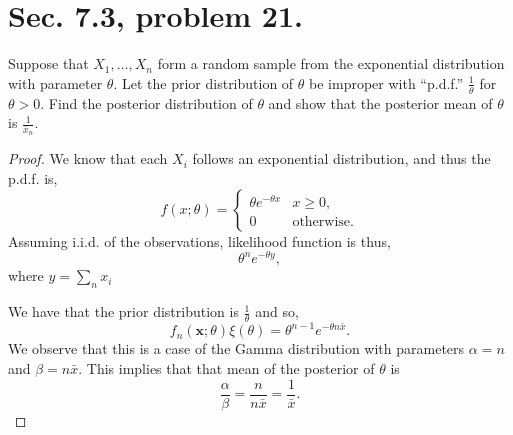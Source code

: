 \documentclass{article}
\newcommand{\randsamp}{X_1,\dots,X_n}
\newcommand{\pdf}{p.d.f. }
\newenvironment{hwproof}[1]
{
    #1
    \begin{proof}
}{
    \end{proof}
}
\begin{document}
\section{Sec. 7.3, problem 21.}
\begin{hwproof}
    {
        Suppose that $\randsamp$ form a random sample from the exponential
        distribution with parameter $\theta$. Let the prior distribution of $\theta$
        be improper with “p.d.f.” $\frac{1}{\theta}$ for $\theta > 0$. Find
        the posterior distribution of $\theta$ and show that the posterior mean
        of $\theta$ is $\frac{1}{\bar{x}_n}$.
    }

    We know that each $X_i$ follows an exponential distribution, and thus the \pdf
    is,
    \begin{equation*}
        f(x ;\theta) = \begin{cases}
            \theta e^{-\theta x} & x \geq 0,         \\
            0                    & \text{otherwise}.
        \end{cases}
    \end{equation*}
    Assuming i.i.d. of the observations, likelihood function is thus,
    \begin{equation*}
        \theta^n e^{-\theta y},
    \end{equation*}
    where $y = \sum_n x_i$

    We have that the prior distribution is $\frac{1}{\theta}$ and so,
    \begin{equation*}
        f_n(\bm{x};\theta)\xi(\theta) = \theta^{n-1}e^{-\theta n\bar{x}}.
    \end{equation*}
    We observe that this is a case of the Gamma distribution with parameters
    $\alpha = n$ and $\beta = n \bar{x}$. This implies that that mean of the
    posterior of $\theta$ is
    \begin{equation*}
        \frac{\alpha}{\beta} = \frac{n}{n\bar{x}} = \frac{1}{\bar{x}}.
    \end{equation*}
\end{hwproof}
\end{document}
